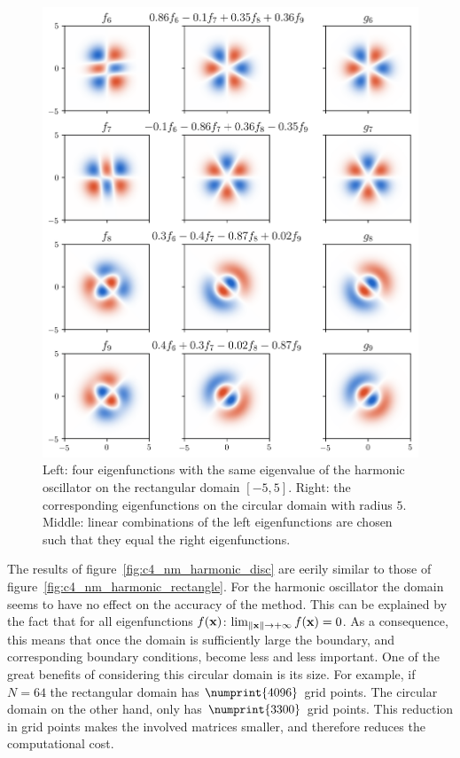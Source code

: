 \begin{figure}
    \begin{center}
        \includegraphics[width=\textwidth]{img/chapter4/nm_test_harmonic_eigenfunctions.png}
    \end{center}
    \caption{Left: four eigenfunctions with the same eigenvalue of the harmonic oscillator on the rectangular domain $[-5, 5]$. Right: the corresponding eigenfunctions on the circular domain with radius $5$. Middle: linear combinations of the left eigenfunctions are chosen such that they equal the right eigenfunctions.}
    \label{fig:c4_nm_harmonic_eigenfunctions}
\end{figure}

The results of figure~\ref{fig:c4_nm_harmonic_disc} are eerily similar to those of figure~\ref{fig:c4_nm_harmonic_rectangle}. For the harmonic oscillator the domain seems to have no effect on the accuracy of the method. This can be explained by the fact that for all eigenfunctions $f(\vb{x})$: $\lim_{\|\vb{x}\| \to +\infty} f(\vb{x}) = 0$. As a consequence, this means that once the domain is sufficiently large the boundary, and corresponding boundary conditions, become less and less important. One of the great benefits of considering this circular domain is its size. For example, if $N = 64$ the rectangular domain has $\numprint{4096}$ grid points. The circular domain on the other hand, only has $\numprint{3300}$ grid points. This reduction in grid points makes the involved matrices smaller, and therefore reduces the computational cost.

